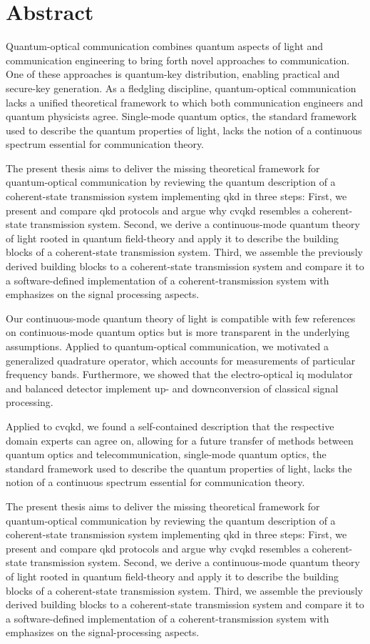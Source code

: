 \section*{Abstract}

Quantum-optical communication combines quantum aspects of light and communication engineering to bring forth novel approaches to communication.
One of these approaches is quantum-key distribution, enabling practical and secure-key generation.
As a fledgling discipline, quantum-optical communication lacks a unified theoretical framework to which both communication engineers and quantum physicists agree.
Single-mode quantum optics, the standard framework used to describe the quantum properties of light, lacks the notion of a continuous spectrum essential for communication theory.

The present thesis aims to deliver the missing theoretical framework for quantum-optical communication by reviewing the quantum description of a coherent-state transmission system implementing \gls{qkd} in three steps:
First, we present and compare \gls{qkd} protocols and argue why \gls{cvqkd} resembles a coherent-state transmission system.
Second, we derive a continuous-mode quantum theory of light rooted in quantum field-theory and apply it to describe the building blocks of a coherent-state transmission system.
Third, we assemble the previously derived building blocks to a coherent-state transmission system and compare it to a software-defined implementation of a coherent-transmission system with emphasizes on the signal processing aspects.

Our continuous-mode quantum theory of light is compatible with few references on continuous-mode quantum optics but is more transparent in the underlying assumptions.
Applied to quantum-optical communication, we motivated a generalized quadrature operator, which accounts for measurements of particular frequency bands.
Furthermore, we showed that the electro-optical \gls{iq} modulator and balanced detector implement up- and downconversion of classical signal processing.

Applied to \gls{cvqkd}, we found a self-contained description that the respective domain experts can agree on, allowing for a future transfer of methods between quantum optics and telecommunication, single-mode quantum optics, the standard framework used to describe the quantum properties of light, lacks the notion of a continuous spectrum essential for communication theory.

The present thesis aims to deliver the missing theoretical framework for quantum-optical communication by reviewing the quantum description of a coherent-state transmission system implementing \gls{qkd} in three steps:
First, we present and compare \gls{qkd} protocols and argue why \gls{cvqkd} resembles a coherent-state transmission system.
Second, we derive a continuous-mode quantum theory of light rooted in quantum field-theory and apply it to describe the building blocks of a coherent-state transmission system.
Third, we assemble the previously derived building blocks to a coherent-state transmission system and compare it to a software-defined implementation of a coherent-transmission system with emphasizes on the signal-processing aspects.

